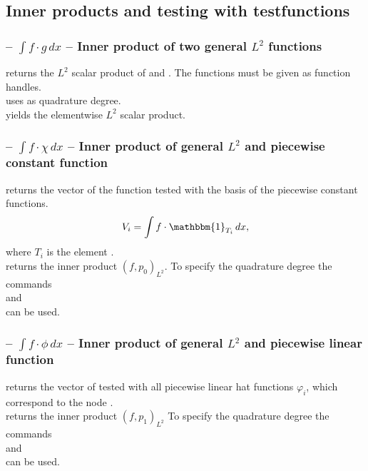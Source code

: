 \documentclass[twoside,11pt,a4paper]{article} %
\begin{document}
\subsection{Inner products and testing with testfunctions}
\subsubsection*{\texorpdfstring{ -- $\int f \cdot g \,dx$ --}{} Inner product of two general \texorpdfstring{$L^2$}{square integrable} functions}
 returns the $L^2$ scalar product of  and . The functions must be given as function handles. \\
 uses  as quadrature degree. \\
 yields the elementwise $L^2$ scalar product.
\subsubsection*{\texorpdfstring{ -- $\int f \cdot \chi \,dx$ --}{} Inner product of general \texorpdfstring{$L^2$}{square integrable} and piecewise constant function}
 returns the vector  of the function  tested with the basis of the piecewise constant functions.
\begin{align*}
 V_i = \int f \cdot \mathbbm{1}_{T_i} \,dx,
\end{align*}
where $T_i$ is the element . \\
 returns the inner product $(f, p_0)_{L^2}$.
To specify the quadrature degree the commands \\
 and \\
 can be used.

\subsubsection*{\texorpdfstring{ -- $\int f \cdot \phi \,dx$ --}{} Inner product of general \texorpdfstring{$L^2$}{square integrable} and piecewise linear function}
 returns the vector  of  tested with all piecewise linear hat functions $\varphi_i$, which correspond to the node . \\
 returns the inner product $(f, p_1)_{L^2}$
To specify the quadrature degree the commands \\
 and \\
 can be used.
\end{document}
